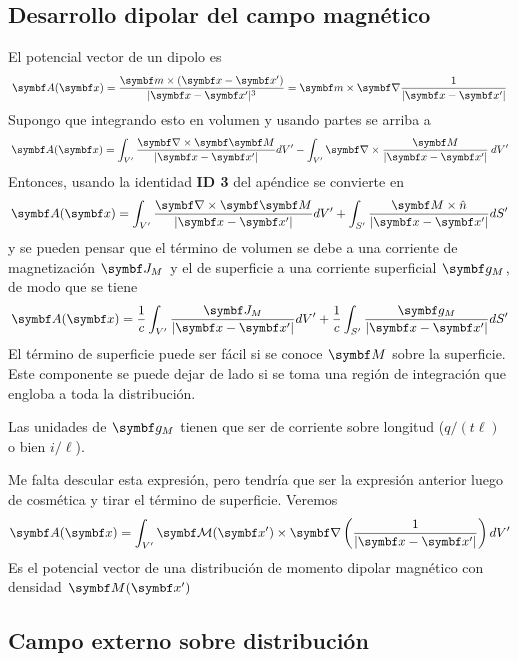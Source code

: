 \documentclass[10pt,oneside]{CBFT_book}
\begin{document}
\subsection{Desarrollo dipolar del campo magnético}

El potencial vector de un dipolo es
\[
	\vb{A}(\vb{x}) = \frac{\vb{m}\times(\vb{x}-\vb{x}')}{|\vb{x}-\vb{x}'|^3} = \vb{m} \times \Nabla 
		\frac{1}{|\vb{x}-\vb{x}'|}
\]
Supongo que integrando esto en volumen y usando partes se arriba a
\[
	\vb{A}(\vb{x}) = \int_{V'} \frac{\rotorm{\vb{M}}}{|\vb{x}-\vb{x}'|} dV' -
	\int_{V'} \Nabla \times \frac{\vb{M}}{|\vb{x}-\vb{x}'|} \: dV'
\]
Entonces, usando la identidad {\bf ID 3} del apéndice se convierte en
\[
	\vb{A}(\vb{x}) = \int_{V'} \frac{\rotorm{\vb{M}}}{|\vb{x}-\vb{x}'|} dV' +
			\int_{S'} \frac{\vb{M}\times\hat{n}}{|\vb{x}-\vb{x}'|} dS'
\]
y se pueden pensar que el término de volumen se debe a una corriente de magnetización 
$\vb{J}_M$ y el de superficie a una corriente superficial $\vb{g}_M$, de modo que
se tiene
\[
	\vb{A}(\vb{x}) = \frac{1}{c} \int_{V'} \frac{\vb{J}_M}{|\vb{x}-\vb{x}'|} dV' +
			\frac{1}{c} \int_{S'} \frac{\vb{g}_M}{|\vb{x}-\vb{x}'|} dS'
\]
El término de superficie puede ser fácil si se conoce $\vb{M}$ sobre la superficie.
Este componente se puede dejar de lado si se toma una región de integración que
engloba a toda la distribución.

Las unidades de $\vb{g}_M$ tienen que ser de corriente sobre longitud ($q/(t\ell)$ 
o bien $i/\ell$).

Me falta descular esta expresión, pero tendría que ser la expresión anterior luego
de cosmética y tirar el término de superficie. Veremos
\[
	\vb{A}(\vb{x}) = \int_{V'} \vb{\mathcal{M}}(\vb{x}') \times \Nabla 
			\left(\frac{1}{|\vb{x}-\vb{x}'|}\right) dV'
\]
Es el potencial vector de una distribución de momento dipolar magnético con densidad
$ \vb{M}(\vb{x}')$

\subsection{Campo externo sobre distribución}
\end{document}
